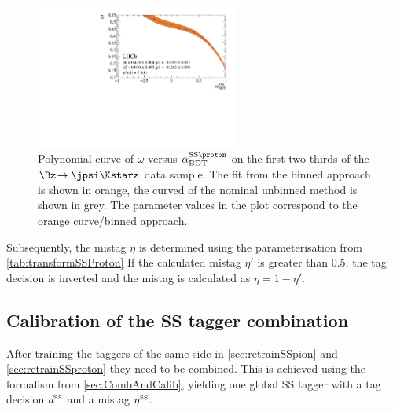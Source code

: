 \begin{figure}[tbp]
	\begin{center}
		\includegraphics[width=0.6\textwidth]{09FlavourTagging/figs/SSProtonBDTTrafo.pdf}
	\end{center}
	\caption{Polynomial curve of $\omega$ versus $\alpha^{\text{SS}\proton}_\text{BDT}$ on the first two thirds of the $\Bz\!\to\jpsi\Kstarz$ data sample.
	The fit from the binned approach is shown in orange, the curved of the nominal unbinned method is shown in grey.
	The parameter values in the plot correspond to the orange curve/binned approach.}
	\label{fig:transformationSSProton}
\end{figure}

Subsequently, the mistag $\eta$ is determined using the parameterisation from \cref{tab:transformSSProton}
If the calculated mistag $\eta'$ is greater than \num{0.5}, the tag decision is inverted and the mistag is calculated as $\eta=1-\eta'$.

\subsection{Calibration of the SS tagger combination}
\label{sec:SScombinationcalibration}

After training the taggers of the same side in \cref{sec:retrainSSpion} and \cref{sec:retrainSSproton} they need to be combined.
This is achieved using the formalism from \cref{sec:CombAndCalib}, yielding one global SS tagger with a tag decision $d^{\text{\tiny SS}}$ and a mistag $\eta^{\text{\tiny SS}}$.

